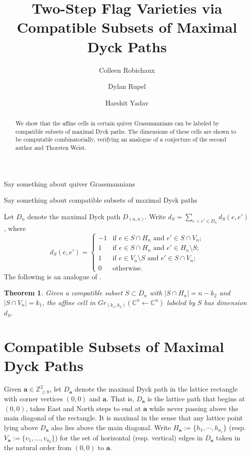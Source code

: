 \documentclass{amsart}
\title{Two-Step Flag Varieties via\\ Compatible Subsets of Maximal Dyck Paths}
\author{Colleen Robichaux}
\author{Dylan Rupel}
\author{Harshit Yadav}
\newtheorem{thm}{Theorem}
\newcommand{\CC}{\mathbb{C}}
\newcommand{\ZZ}{\mathbb{Z}}
\newcommand{\bfa}{\mathbf{a}}
\begin{document}
  \begin{abstract}
    We show that the affine cells in certain quiver Grassmannians can be labeled by compatible subsets of maximal Dyck paths.
    The dimensions of these cells are shown to be computable combinatorially, verifying an analogue of a conjecture of the second author and Thorsten Weist.
  \end{abstract}
  \maketitle

  Say something about quiver Grassmannians

  Say something about compatible subsets of maximal Dyck paths

  Let $D_n$ denote the maximal Dyck path $D_{(n,n)}$.
  Write $d_S=\sum\limits_{e<e'\in D_n} d_S(e,e')$, where
  \[
    d_S(e,e')=
    \begin{cases}
      -1 & \text{if $e\in S\cap H_n$ and $e'\in S\cap V_n$;}\\
      1 & \text{if $e\in S\cap H_n$ and $e'\in H_n\setminus S$;}\\
      1 & \text{if $e\in V_n\setminus S$ and $e'\in S\cap V_n$;}\\
      0 & \text{otherwise.}
    \end{cases}
  \]
  The following is an analogue of \cite[Conjecture 5.21]{rupel-weist}.
  \begin{thm}
    Given a compatible subset $S\subset D_n$ with $|S\cap H_n|=n-k_2$ and $|S\cap V_n|=k_1$, the affine cell in $Gr_{(k_1,k_2)}(\CC^n\leftarrow\CC^n)$ labeled by $S$ has dimension $d_S$.
  \end{thm}


  \section{Compatible Subsets of Maximal Dyck Paths}
  Given $\bfa\in\ZZ_{\ge0}^2$, let $D_\bfa$ denote the maximal Dyck path in the lattice rectangle with corner vertices $(0,0)$ and $\bfa$.
  That is, $D_\bfa$ is the lattice path that begins at $(0,0)$, takes East and North steps to end at $\bfa$ while never passing above the main diagonal of the rectangle.
  It is maximal in the sense that any lattice point lying above $D_\bfa$ also lies above the main diagonal.
  Write $H_\bfa:=\{h_1,\cdots,h_{a_1}\}$ (resp. $V_\bfa:=\{v_1,\ldots,v_{a_2}\}$) for the set of horizontal (resp. vertical) edges in $D_\bfa$ taken in the natural order from $(0,0)$ to $\bfa$.
\end{document}
